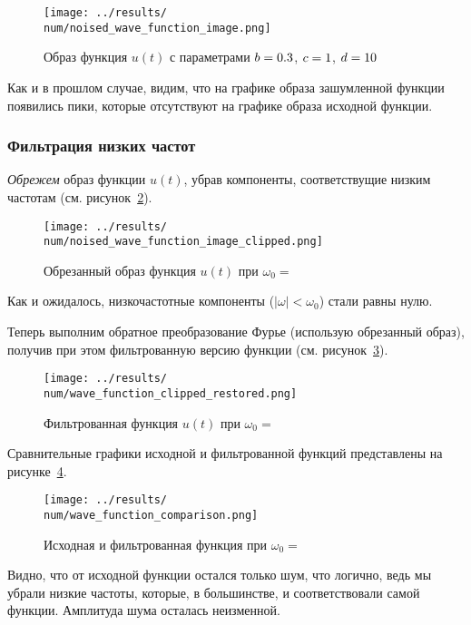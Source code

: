 \begin{figure}[ht!]
    \centering
    \texttt{[image: ../results/\\num/noised\_wave\_function\_image.png]}
    \caption{Образ функция $u(t)$ с параметрами $b = 0.3$, $c = 1$, $d = 10$}
    \label{fig:noised_wave_function_image_\num}
\end{figure}

Как и в прошлом случае, видим, что на графике образа зашумленной функции появились пики, которые отсутствуют на графике образа исходной функции.

\FloatBarrier
\subsubsection{Фильтрация низких частот}
\textit{Обрежем} образ функции $u(t)$, убрав компоненты, соответствущие низким частотам (см. рисунок~\ref{fig:noised_wave_function_image_clipped_\num}).

\begin{figure}[ht!]
    \centering
    \texttt{[image: ../results/\\num/noised\_wave\_function\_image\_clipped.png]}
    \caption{Обрезанный образ функция $u(t)$ при $\omega_0=$~\imageclip}
    \label{fig:noised_wave_function_image_clipped_\num}
\end{figure}

Как и ожидалось, низкочастотные компоненты ($|\omega| < \omega_0$) стали равны нулю. 

Теперь выполним обратное преобразование Фурье (использую обрезанный образ), получив при этом фильтрованную версию функции (см. рисунок~\ref{fig:wave_function_clipped_restored_\num}).

\begin{figure}[ht!]
    \centering
    \texttt{[image: ../results/\\num/wave\_function\_clipped\_restored.png]}
    \caption{Фильтрованная функция $u(t)$ при $\omega_0=$~\imageclip}
    \label{fig:wave_function_clipped_restored_\num}
\end{figure}

Сравнительные графики исходной и фильтрованной функций представлены на рисунке~\ref{fig:wave_function_comparison_\num}. 
\begin{figure}[ht!]
    \centering
    \texttt{[image: ../results/\\num/wave\_function\_comparison.png]}
    \caption{Исходная и фильтрованная функция при $\omega_0=$~\imageclip}
    \label{fig:wave_function_comparison_\num}
\end{figure}

Видно, что от исходной функции остался только шум, что логично, ведь мы убрали низкие частоты, которые, в большинстве, и соответствовали самой функции.
Амплитуда шума осталась неизменной. 

